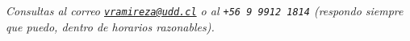 \documentclass[12pt,a4paper]{article}
\begin{document}
\vspace{1em}
\begin{center}
\textit{Consultas al correo
\href{mailto:vramireza@udd.cl}{\texttt{vramireza@udd.cl}} o al
\texttt{+56\,9\,9912\,1814}
(respondo siempre que puedo, dentro de horarios razonables).}
\end{center}

\end{document}
